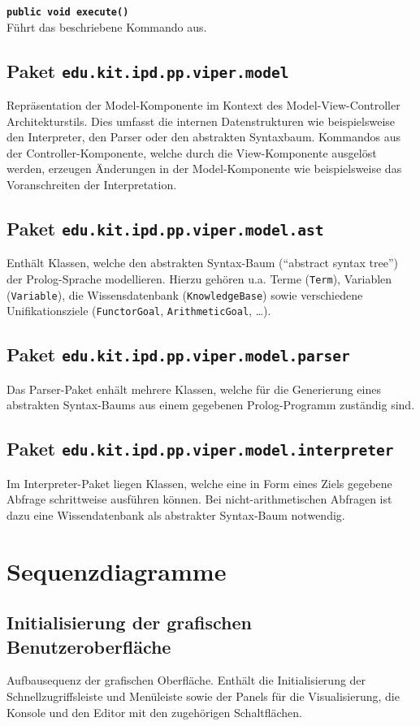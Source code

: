\documentclass[parskip=full,11pt,twoside]{scrartcl}
\begin{document}
\textbf{\texttt{public void execute()}}\\
Führt das beschriebene Kommando aus.

\subsection{Paket \texttt{edu.kit.ipd.pp.viper.model}}
Repräsentation der Model-Komponente im Kontext des Model-View-Controller Architekturstils. Dies umfasst die internen Datenstrukturen wie beispielsweise den Interpreter, den Parser oder den abstrakten Syntaxbaum. Kommandos aus der Controller-Komponente, welche durch die View-Komponente ausgelöst werden, erzeugen Änderungen in der Model-Komponente wie beispielsweise das Voranschreiten der Interpretation.

\subsection{Paket \texttt{edu.kit.ipd.pp.viper.model.ast}}
Enthält Klassen, welche den abstrakten Syntax-Baum (\enquote{abstract syntax tree}) der Prolog-Sprache modellieren. Hierzu gehören u.a. Terme (\texttt{Term}), Variablen (\texttt{Variable}), die Wissensdatenbank (\texttt{KnowledgeBase}) sowie verschiedene Unifikationsziele (\texttt{FunctorGoal}, \texttt{ArithmeticGoal}, \dots).

\subsection{Paket \texttt{edu.kit.ipd.pp.viper.model.parser}}
Das Parser-Paket enhält mehrere Klassen, welche für die Generierung eines abstrakten Syntax-Baums aus einem gegebenen Prolog-Programm zuständig sind.

\subsection{Paket \texttt{edu.kit.ipd.pp.viper.model.interpreter}}
Im Interpreter-Paket liegen Klassen, welche eine in Form eines Ziels gegebene Abfrage schrittweise ausführen können. Bei nicht-arithmetischen Abfragen ist dazu eine Wissendatenbank als abstrakter Syntax-Baum notwendig.

\section{Sequenzdiagramme}

\subsection{Initialisierung der grafischen Benutzeroberfläche}
Aufbausequenz der grafischen Oberfläche. Enthält die Initialisierung der Schnellzugriffsleiste und Menüleiste sowie der Panels für die Visualisierung, die Konsole und den Editor mit den zugehörigen Schaltflächen.
\end{document}
